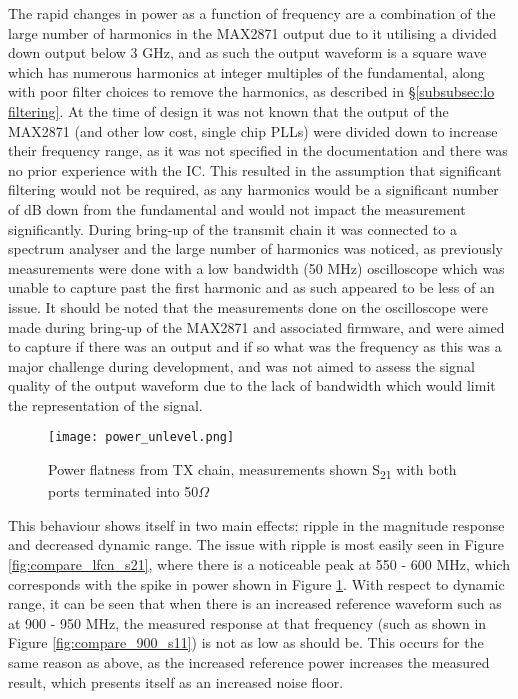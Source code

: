 The rapid changes in power as a function of frequency are a combination of the large number of harmonics in the MAX2871 output due to it utilising a divided down output below 3 GHz, and as such the output waveform is a square wave which has numerous harmonics at integer multiples of the fundamental, along with poor filter choices to remove the harmonics, as described in \S \ref{subsubsec:lo filtering}. At the time of design it was not known that the output of the MAX2871 (and other low cost, single chip PLLs) were divided down to increase their frequency range, as it was not specified in the documentation and there was no prior experience with the IC. This resulted in the assumption that significant filtering would not be required, as any harmonics would be a significant number of dB down from the fundamental and would not impact the measurement significantly. During bring-up of the transmit chain it was connected to a spectrum analyser and the large number of harmonics was noticed, as previously measurements were done with a low bandwidth (50 MHz) oscilloscope which was unable to capture past the first harmonic and as such appeared to be less of an issue. It should be noted that the measurements done on the oscilloscope were made during bring-up of the MAX2871 and associated firmware, and were aimed to capture if there was an output and if so what was the frequency as this was a major challenge during development, and was not aimed to assess the signal quality of the output waveform due to the lack of bandwidth which would limit the representation of the signal. 

\begin{figure}[H]
	\centering
	\texttt{[image: power\_unlevel.png]}
	\caption{Power flatness from TX chain, measurements shown S\textsubscript{21} with both ports terminated into 50$\Omega$}
	\label{fig:power_unlevel}
\end{figure}

This behaviour shows itself in two main effects: ripple in the magnitude response and decreased dynamic range. The issue with ripple is most easily seen in Figure \ref{fig:compare_lfcn_s21}, where there is a noticeable peak at 550 - 600 MHz, which corresponds with the spike in power shown in Figure \ref{fig:power_unlevel}. With respect to dynamic range, it can be seen that when there is an increased reference waveform such as at 900 - 950 MHz, the measured response at that frequency (such as shown in Figure \ref{fig:compare_900_s11}) is not as low as should be. This occurs for the same reason as above, as the increased reference power increases the measured result, which presents itself as an increased noise floor.  

